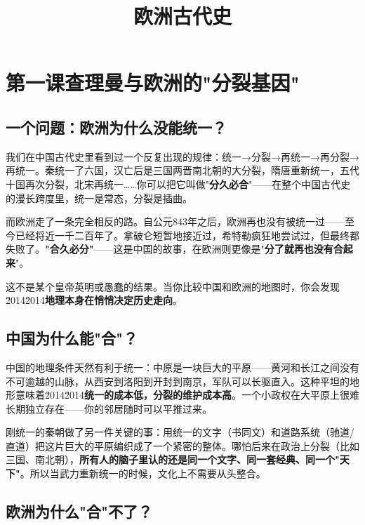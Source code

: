 \documentclass[a4paper,12pt]{ctexart}
\title{\textcolor{blue!70!black}{\Huge\textbf{欧洲古代史}}}
\author{}
\date{}
\begin{document}
\maketitle
\thispagestyle{empty}

\tableofcontents
\newpage

\section{\textcolor{orange!80!black}{第一课\quad 查理曼与欧洲的"分裂基因"}}

\subsection*{一个问题：欧洲为什么没能统一？}

我们在中国古代史里看到过一个反复出现的规律：统一→分裂→再统一→再分裂→再统一。秦统一了六国，汉亡后是三国两晋南北朝的大分裂，隋唐重新统一，五代十国再次分裂，北宋再统一……你可以把它叫做"\textbf{分久必合}"——在整个中国古代史的漫长跨度里，统一是常态，分裂是插曲。

而欧洲走了一条完全相反的路。自公元843年之后，欧洲再也没有被统一过——至今已经将近一千二百年了。拿破仑短暂地接近过，希特勒疯狂地尝试过，但最终都失败了。\textbf{"合久必分"}——这是中国的故事，在欧洲则更像是"\textbf{分了就再也没有合起来}"。

这不是某个皇帝英明或愚蠢的结果。当你比较中国和欧洲的地图时，你会发现\u2014\u2014\textbf{地理本身在悄悄决定历史走向}。

\subsection*{中国为什么能"合"？}

中国的地理条件天然有利于统一：中原是一块巨大的平原——黄河和长江之间没有不可逾越的山脉，从西安到洛阳到开封到南京，军队可以长驱直入。这种平坦的地形意味着\u2014\u2014\textbf{统一的成本低，分裂的维护成本高}。一个小政权在大平原上很难长期独立存在——你的邻居随时可以平推过来。

刚统一的秦朝做了另一件关键的事：用统一的文字（书同文）和道路系统（驰道/直道）把这片巨大的平原编织成了一个紧密的整体。哪怕后来在政治上分裂（比如三国、南北朝），\textbf{所有人的脑子里认的还是同一个文字、同一套经典、同一个"天下"}。所以当武力重新统一的时候，文化上不需要从头整合。

\subsection*{欧洲为什么"合"不了？}
\end{document}
